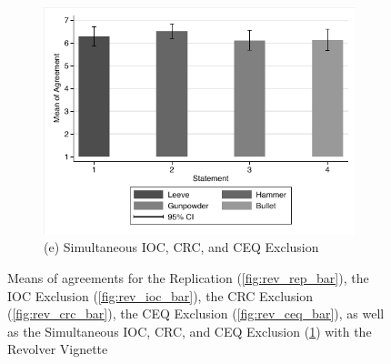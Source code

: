 \documentclass[egregdoesnotlikesansseriftitles,12pt]{scrartcl}
\begin{document}
\begin{landscape}
\begin{figure}[h!]
\begin{subfigure}[t]{0.28\textwidth}
      \includegraphics[scale=0.7]{figures/rev_com_bar.pdf}
      \caption{\textsf{\scriptsize(e) Simultaneous IOC, CRC, and CEQ Exclusion}}
      \label{fig:rev_com_bar}
   \end{subfigure}
   \caption{Means of agreements for the Replication (\ref{fig:rev_rep_bar}), the IOC Exclusion (\ref{fig:rev_ioc_bar}), the CRC Exclusion (\ref{fig:rev_crc_bar}), the CEQ Exclusion (\ref{fig:rev_ceq_bar}), as well as the Simultaneous IOC, CRC, and CEQ Exclusion (\ref{fig:rev_com_bar}) with the Revolver Vignette}\label{fig:rev}
\end{figure}
\end{landscape}
\end{document}
